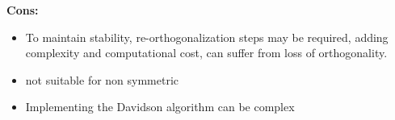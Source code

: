 \documentclass{article}
\theoremstyle{remark}
\begin{document}
\begin{enumerate}
    \textbf{Cons:}
    \begin{itemize}
        \item To maintain stability, re-orthogonalization steps may be required, adding complexity and computational cost, can suffer from loss of orthogonality.

        \item not suitable for non symmetric
        \item Implementing the Davidson algorithm can be complex
    \end{itemize}
\end{enumerate}
    
\end{document}
